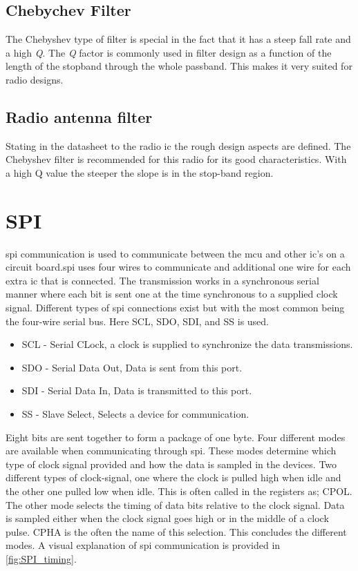 \subsection{Chebychev Filter}
The Chebyshev type of filter is special in the fact that it has a steep fall rate and a high \emph{Q}. The \emph{Q} factor is commonly used in filter design as a function of the length of the stopband through the whole passband.
This makes it very suited for radio designs.




\subsection{Radio antenna filter}
Stating in the datasheet to the radio \gls{ic} the rough design aspects are defined. The Chebyshev filter is recommended for this radio for its good characteristics. With a high Q value the steeper the slope is in the stop-band region.



\section{SPI}
\gls{spi} communication is used to communicate between the \gls{mcu} and other \gls{ic}'s on a circuit board.\gls{spi} uses four wires to communicate and additional one wire for each extra \gls{ic} that is connected. The transmission works in a synchronous serial manner where each bit is sent one at the time synchronous to a supplied clock signal. Different types of \gls{spi} connections exist but with the most common being the four-wire serial bus. Here SCL, SDO, SDI, and SS is used. \cite{pic_spi} 

\begin{itemize}[noitemsep]
    \item SCL  -      Serial CLock, a clock is supplied to synchronize the data transmissions.
    \item SDO -     Serial Data Out, Data is sent from this port.
    \item SDI  -     Serial Data In, Data is transmitted to this port.
    \item SS    -     Slave Select, Selects a device for communication.
\end{itemize}
 
Eight bits are sent together to form a package of one byte. Four different modes are available when communicating through \gls{spi}. These modes determine which type of clock signal provided and how the data is sampled in the devices. Two different types of clock-signal, one where the clock is pulled high when idle and the other one pulled low when idle. This is often called in the registers as; CPOL. 
The other mode selects the timing of data bits relative to the clock signal. Data is sampled either when the clock signal goes high or in the middle of a clock pulse. CPHA is the often the name of this selection. This concludes the different modes. A visual explanation of \gls{spi} communication is provided in \autoref{fig:SPI_timing}. 


